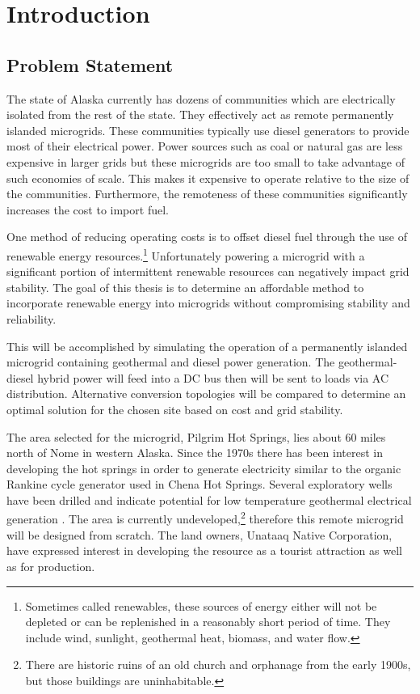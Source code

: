 \chapter{Introduction}
\label{ch:intro}

\section{Problem Statement}
The state of Alaska currently has dozens of communities which are electrically isolated from the rest of the state. They effectively act as remote permanently islanded microgrids. These communities typically use diesel generators to provide most of their electrical power. Power sources such as coal or natural gas are less expensive in larger grids but these microgrids are too small to take advantage of such economies of scale. This makes it expensive to operate relative to the size of the communities. Furthermore, the remoteness of these communities significantly increases the cost to import fuel.

One method of reducing operating costs is to offset diesel fuel through the use of renewable energy resources.\footnote{Sometimes called renewables, these sources of energy either will not be depleted or can be replenished in a reasonably short period of time. They include wind, sunlight, geothermal heat, biomass, and water flow.} Unfortunately powering a microgrid with a significant portion of intermittent renewable resources can negatively impact grid stability. The goal of this thesis is to determine an affordable method to incorporate renewable energy into microgrids without compromising stability and reliability. 

This will be accomplished by simulating the operation of a permanently islanded microgrid containing geothermal and diesel power generation. The geo\-ther\-mal\--die\-sel hybrid power will feed into a DC bus then will be sent to loads via AC distribution. Alternative conversion topologies will be compared to determine an optimal solution for the chosen site based on cost and grid stability.

The area selected for the microgrid, Pilgrim Hot Springs, lies about 60 miles north of Nome in western Alaska. Since the 1970s there has been interest in developing the hot springs in order to generate electricity similar to the organic Rankine cycle generator used in Chena Hot Springs. Several exploratory wells have been drilled and indicate potential for low temperature geothermal electrical generation \cite{Holdmann2013}. The area is currently undeveloped,\footnote{There are historic ruins of an old church and orphanage from the early 1900s, but those buildings are uninhabitable.} therefore this remote microgrid will be designed from scratch. The land owners, Unataaq Native Corporation, have expressed interest in developing the resource as a tourist attraction as well as for production.

